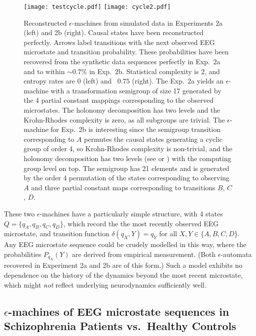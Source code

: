 \documentclass[journal]{IEEEtran}
\begin{document}
\begin{figure}[!h]
\begin{center}
 \texttt{[image: testcycle.pdf]}
  \texttt{[image: cycle2.pdf]}
 \caption{Reconstructed $\epsilon$-machines from simulated data in Experiments 2a (left) and 2b (right). Causal states have been reconstructed perfectly. Arrows
 label transitions with the next observed EEG microstate and transition probability. 
These probabilities have been recovered from the synthetic data sequences perfectly in Exp.~2a and to within $\sim 0.7$\%  in Exp.~2b.
Statistical complexity is 2, and entropy rates are $0$ (left) and ~$0.75$ (right). The Exp.~2a yields an $\epsilon$-machine with a transformation semigroup of size 17 generated by the 4 partial constant mappings corresponding to the observed microstates. The holonomy decomposition has two levels and the Krohn-Rhodes complexity is zero, as all subgroups are trivial. 
 The $\epsilon$-machine for Exp.~2b is interesting since the semigroup transition corresponding to $A$ permutes the causal states generating a cyclic group of order 4, so Krohn-Rhodes complexity is non-trivial, and the holonomy decomposition has two levels (see \cite{wildbook} or \cite{AttilaJamesChrystopher}) with the
 computing group level on top. The semigroup has 21 elements and is generated by the order 4 permutation of the states corresponding to observing $A$ and three partial constant maps corresponding to transitions $B$, $C$, $D$. 
 \label{cycles}}
 \end{center}
 \end{figure}
 
 These two $\epsilon$-machines have a particularly simple structure, with 4 states  $Q=\{q_A,q_B,q_C,q_D\}$, which record the
the most recently observed EEG microstate, and transition function $\delta(q_X, Y)= q_Y$ for all $X, Y \in \{A,B,C,D\}$.
Any EEG microstate sequence could be crudely modelled in this way,   where  the probabilities $P_{q_X}(Y)$  are derived from
empirical measurement.  (Both $\epsilon$-automata recovered
in Experiment 2a and 2b are of this form.) Such a model exhibits no dependence on the history of the dynamics beyond the most recent microstate,
which might {\em not} reflect underlying neurodynamics sufficiently well. 





\subsection{$\epsilon$-machines of EEG microstate sequences in Schizophrenia Patients vs.\ Healthy Controls}\label{ExpD}
\end{document}
